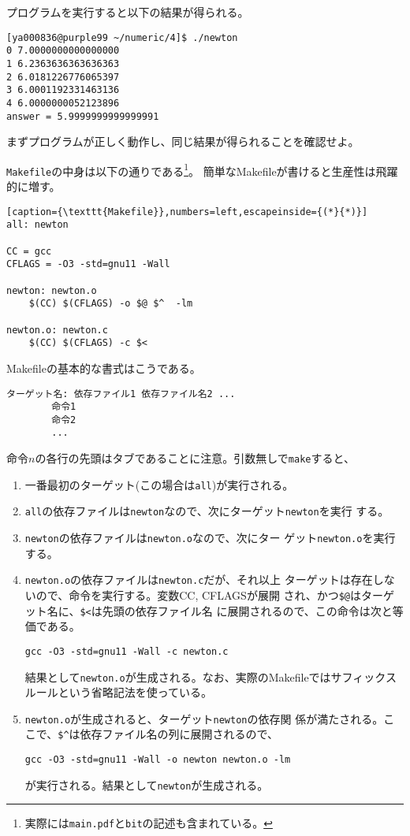 \documentclass[a4paper]{jsarticle}
\begin{document}
プログラムを実行すると以下の結果が得られる。
\begin{lstlisting}
[ya000836@purple99 ~/numeric/4]$ ./newton
0 7.0000000000000000
1 6.2363636363636363
2 6.0181226776065397
3 6.0001192331463136
4 6.0000000052123896
answer = 5.9999999999999991
\end{lstlisting}
まずプログラムが正しく動作し、同じ結果が得られることを確認せよ。

\texttt{Makefile}の中身は以下の通りである\footnote{実際には\texttt{main.pdf}と\texttt{bit}の記述も含まれている。}。
簡単なMakefileが書けると生産性は飛躍的に増す。
\begin{lstlisting}[caption={\texttt{Makefile}},numbers=left,escapeinside={(*}{*)}]
all: newton

CC = gcc
CFLAGS = -O3 -std=gnu11 -Wall

newton: newton.o
	$(CC) $(CFLAGS) -o $@ $^  -lm

newton.o: newton.c
	$(CC) $(CFLAGS) -c $<
\end{lstlisting}

Makefileの基本的な書式はこうである。
\begin{lstlisting}
ターゲット名: 依存ファイル1 依存ファイル名2 ...
        命令1
        命令2
        ...
\end{lstlisting}
命令$n$の各行の先頭はタブであることに注意。引数無しで\texttt{make}すると、
\begin{enumerate}
 \item 一番最初のターゲット(この場合は\texttt{all})が実行される。
 \item \texttt{all}の依存ファイルは\texttt{newton}なので、次にターゲット\texttt{newton}を実行
する。
 \item \texttt{newton}の依存ファイルは\texttt{newton.o}なので、次にター
       ゲット\texttt{newton.o}を実行する。
 \item \texttt{newton.o}の依存ファイルは\texttt{newton.c}だが、それ以上
       ターゲットは存在しないので、命令を実行する。変数CC, CFLAGSが展開
       され、かつ\verb|$@|はターゲット名に、\verb|$<|は先頭の依存ファイル名
       に展開されるので、この命令は次と等価である。
\begin{lstlisting}
gcc -O3 -std=gnu11 -Wall -c newton.c
\end{lstlisting}
結果として\texttt{newton.o}が生成される。なお、実際のMakefileではサフィックス
ルールという省略記法を使っている。
\item \texttt{newton.o}が生成されると、ターゲット\texttt{newton}の依存関
      係が満たされる。ここで、\verb|$^|は依存ファイル名の列に展開されるので、
\begin{lstlisting}
gcc -O3 -std=gnu11 -Wall -o newton newton.o -lm
\end{lstlisting}
が実行される。結果として\texttt{newton}が生成される。
\end{enumerate}
\end{document}
